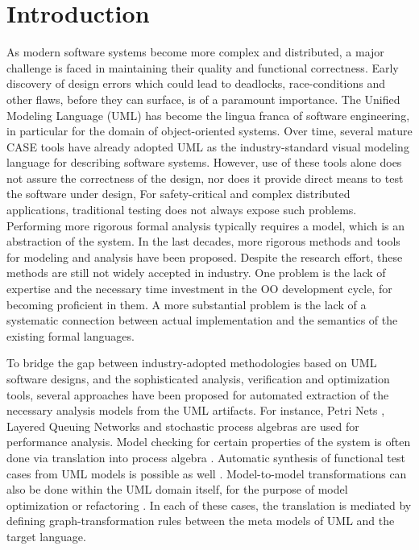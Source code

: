 \documentclass[letter]{llncs}
\newcommand{\secshrinkbegin}{\vspace{-.2cm}}
\begin{document}
\section{Introduction}
\label{sec:Introduction}
\secshrinkbegin
\vspace{-5 pt}
As modern software systems become more complex and distributed, a major
challenge is faced 
in maintaining their quality and functional correctness. Early discovery of
design errors which could
lead to deadlocks, race-conditions and other flaws, before they can surface,
is of a paramount importance.
The Unified Modeling Language (UML) \cite{UML2.4} has become the lingua franca
of software engineering, in particular for the domain of object-oriented
systems. Over time, several mature CASE tools have already adopted UML as the
industry-standard visual modeling language for describing software systems. 
However, use of these tools alone does not
assure the correctness of the design, nor does it provide direct means to test
the software under design,
For safety-critical and
complex distributed applications, traditional testing does not always expose
such problems. Performing more rigorous formal
analysis typically requires a model, which is an abstraction of the system.
In the last decades, more rigorous methods and tools for modeling and analysis
 have been proposed. Despite the research effort,
these methods are still not widely
accepted in industry. One problem is the lack of expertise and the necessary
time investment in the OO development cycle, for becoming proficient in them. 
A more substantial problem is the lack of a systematic connection between 
actual implementation and the semantics of the existing formal languages. 
\vspace{-1 pt}

To bridge the gap between industry-adopted methodologies based on UML
software designs, and the sophisticated analysis, verification and optimization tools, several approaches have been proposed for
automated extraction of the necessary analysis models from the UML artifacts. For instance, Petri
Nets \cite{DBLP:journals/tse/DistefanoSP11,Bernardi:2002:USD:584369.584376}, Layered 
Queuing Networks \cite{Petriu:2002:AUP:647810.737982}
and stochastic process algebras
\cite{Tribastone:2008:AEP:1383559.1383569,Tribastone:2008:ATU:1446304.1447447} are used for performance
analysis. Model checking for certain properties of the system is often done via
translation into process algebra
\cite{10.1109/APSEC.2005.7,inpJuDuJuLaPo06a}. Automatic synthesis of functional
test cases from UML models is possible as well
\cite{Bandyopadhyay:2009:TIG:1547558.1548197,Pickin02systemtest}. 
Model-to-model transformations
can also be done within the UML domain itself, for the purpose of model optimization or
refactoring \cite{Whittle:2002:TSM:647246.719610}.
In each of these cases, the translation is mediated by defining
graph-transformation rules between the meta models of UML and the target language.
\end{document}
